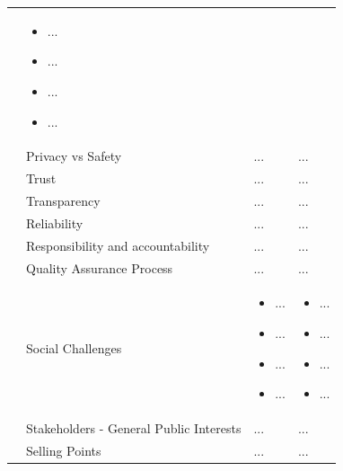\begin{table}
\begin{small}
\begin{supertabular}{>{}p{.02\textwidth}|>{\raggedright}p{.105\textwidth}>{\raggedright}p{.4\textwidth}>{\raggedright}p{.4\textwidth}}
\begin{itemize}
					\end{itemize}					  & 
					\begin{itemize}
					\item ...
					\item ...
					\item ...
					\item ...
					\end{itemize}										 
 			 \tabularnewline {}
			& Privacy vs Safety & ...  & ...  
 			 \tabularnewline {}
			& Trust & ...  & ... 
 			 \tabularnewline {}
			& Transparency & ...  & ...  
 			 \tabularnewline {}
			& Reliability & ...  & ...  
 			 \tabularnewline {}
			& Responsibility and accountability & ...  & ...  
 			 \tabularnewline {}
			& Quality Assurance Process & ...  & ...  
			\tabularnewline {}
			 &Social Challenges & 
					\begin{itemize}
					\item ...
					\item ...
					\item ...
					\item ...
					\end{itemize}
 			& 	
					\begin{itemize}
					\item ...
					\item ...
					\item ...
					\item ...
					\end{itemize} 
			\tabularnewline {}
			& Stakeholders - General Public Interests & ...  & ...  
 			 \tabularnewline {}
			& Selling Points & ...  & ...  
 			 \tabularnewline 			 																							
			\bottomrule
		\end{supertabular}
	\end{small}
	
\end{table}


